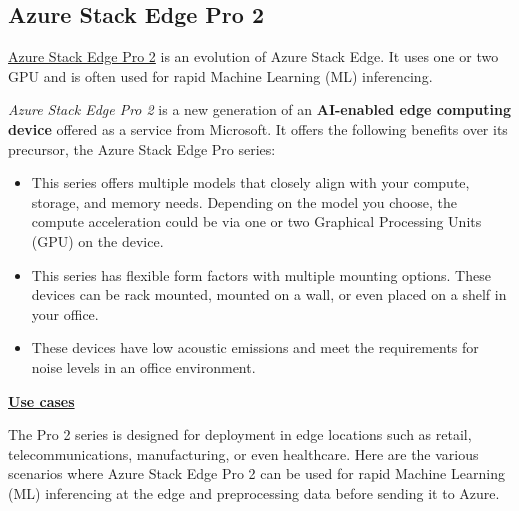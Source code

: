 \documentclass[a4paper]{article}
\begin{document}
    \newpage

    \subsection{Azure Stack Edge Pro 2}\label{subsection: azure stack edge pro 2}

    \href{https://learn.microsoft.com/en-us/azure/databox-online/azure-stack-edge-pro-2-overviewURL}{Azure Stack Edge Pro 2} is an evolution of Azure Stack Edge. It uses one or two GPU and is often used for rapid Machine Learning (ML) inferencing.\newline

    \noindent
    \emph{Azure Stack Edge Pro 2} is a new generation of an \textbf{AI-enabled edge computing device} offered as a service from Microsoft. It offers the following benefits over its precursor, the Azure Stack Edge Pro series:
    \begin{itemize}
        \item This series offers multiple models that closely align with your compute, storage, and memory needs. Depending on the model you choose, the compute acceleration could be via one or two Graphical Processing Units (GPU) on the device.
        
        \item This series has flexible form factors with multiple mounting options. These devices can be rack mounted, mounted on a wall, or even placed on a shelf in your office.
        
        \item These devices have low acoustic emissions and meet the requirements for noise levels in an office environment.
    \end{itemize}
    \begin{flushleft}
        \textbf{\underline{Use cases}}
    \end{flushleft}
    The Pro 2 series is designed for deployment in edge locations such as retail, telecommunications, manufacturing, or even healthcare. Here are the various scenarios where Azure Stack Edge Pro 2 can be used for rapid Machine Learning (ML) inferencing at the edge and preprocessing data before sending it to Azure.
\end{document}
